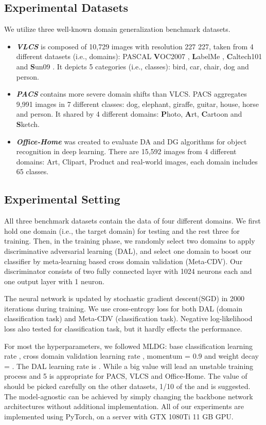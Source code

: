\documentclass[twocolumn,preprint]{elsarticle}
\begin{document}
\subsection{Experimental Datasets} \label{sub:dataset}
We utilize three well-known domain generalization benchmark datasets. 
\begin{itemize}
 \item \textit{\textbf{VLCS}} \cite{VLCS} is composed of 10,729 images with resolution 227  227, taken from 4 different datasets (i.e., domains): PASCAL \textbf{V}OC2007 \cite{voc}, \textbf{L}abelMe \cite{labelme}, \textbf{C}altech101 \cite{caltech} and \textbf{S}un09 \cite{sun}. It depicts 5 categories (i.e., classes): bird, car, chair, dog and person. 
 \item \textit{\textbf{PACS}} \cite{tf} contains more severe domain shifts than VLCS. PACS aggregates 9,991 images in 7 different classes: dog, elephant, giraffe, guitar, house, horse and person. It shared by 4 different domains: \textbf{P}hoto, \textbf{A}rt, \textbf{C}artoon and \textbf{S}ketch. 
 \item \textit{\textbf{Office-Home}} \cite{office-home} was created to evaluate DA and DG algorithms for object recognition in deep learning. There are 15,592 images from 4 different domains: Art, Clipart, Product and real-world images, each domain includes 65 classes.
\end{itemize}

\subsection{Experimental Setting} \label{sub:exp_setting}
All three benchmark datasets contain the data of four different domains. We first hold one domain (i.e., the target domain) for testing and the rest three for training. Then, in the training phase, we randomly select two domains to apply discriminative adversarial learning (DAL), and select one domain to boost our classifier by meta-learning based cross domain validation (Meta-CDV). Our discriminator consists of two fully connected layer with 1024 neurons each and one output layer with 1 neuron.

The neural network is updated by stochastic gradient descent(SGD) in 2000 iterations during training. We use cross-entropy loss for both DAL (domain classification task) and Meta-CDV (classification task). Negative log-likelihood loss also tested for classification task, but it hardly effects the performance. 

For most the hyperparameters, we followed MLDG: base classification learning rate , cross domain validation learning rate , momentum = 0.9 and weight decay = . The DAL learning rate is . While a big  value will lead an unstable training process and 5  is appropriate for PACS, VLCS and Office-Home. The value of  should be picked carefully on the other datasets, 1/10 of the  and  is suggested. The model-agnostic can be achieved by simply changing the backbone network architectures without additional implementation. All of our experiments are implemented using PyTorch, on a server with GTX 1080Ti 11 GB GPU.
\end{document}
